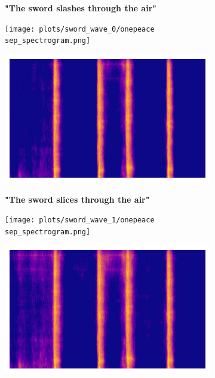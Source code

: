 \begin{figure}[!htbp]
    \begin{subfigure}[b]{0.3\textwidth}
        \centering
        \scriptsize\textbf{"The sword slashes through the air"}
        \vspace{13mm}
    \end{subfigure}
    \begin{subfigure}[b]{0.3\textwidth}
        \centering
        \texttt{[image: plots/sword\_wave\_0/onepeace sep\_spectrogram.png]}
    \end{subfigure}
    \begin{subfigure}[b]{0.3\textwidth}
        \centering
        \includegraphics[width=\textwidth]{plots/sword_wave_0/clap sep_spectrogram.png}
    \end{subfigure}

    \begin{subfigure}[b]{0.3\textwidth}
        \centering
        \scriptsize\textbf{"The sword slices through the air"}
        \vspace{13mm}
    \end{subfigure}
    \begin{subfigure}[b]{0.3\textwidth}
        \centering
        \texttt{[image: plots/sword\_wave\_1/onepeace sep\_spectrogram.png]}
    \end{subfigure}
    \begin{subfigure}[b]{0.3\textwidth}
        \centering
        \includegraphics[width=\textwidth]{plots/sword_wave_1/clap sep_spectrogram.png}
    \end{subfigure}


\end{figure}
